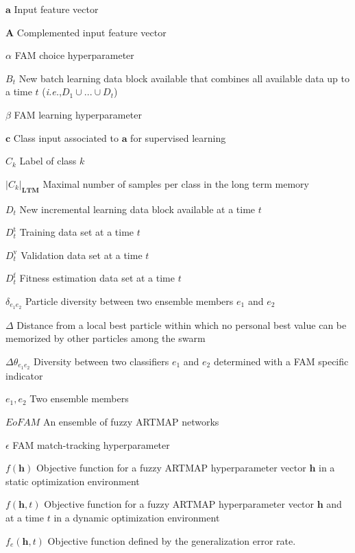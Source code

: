 \documentclass[letterpaper, twoside, 12pt, memoire, creativecommons, hyperref]{thETS}
\begin{document}
\begin{listofsymbols}[3cm]
\item [$\textbf{a}$] Input feature vector
\item [$\textbf{A}$] Complemented input feature vector
\item [$\alpha$] FAM choice hyperparameter
\item [$B_t$] New batch learning data block available that combines all available data up to a time $t$ (\emph{i.e.},$D_1 \cup ... \cup D_t$)
\item [$\beta$] FAM learning hyperparameter
\item [$\mathbf{c}$] Class input associated to $\textbf{a}$ for supervised learning
\item [$C_k$] Label of class $k$
\item [$|C_k|_\mathbf{LTM}$] Maximal number of samples per class in the long term memory
\item [$D_t$] New incremental learning data block available at a time $t$
\item [$D_t^\text{t}$] Training data set at a time $t$
\item [$D_t^\text{v}$] Validation data set at a time $t$
\item [$D_t^\text{f}$] Fitness estimation data set at a time $t$
\item [$\delta_{e_1e_2}$] Particle diversity between two ensemble members $e_1$ and $e_2$
\item [$\Delta$] Distance from a local best particle within which no personal best value can be memorized by other particles among the swarm
\item [$\Delta\theta_{e_1e_2}$] Diversity between two classifiers $e_1$ and $e_2$ determined with a FAM specific indicator
\item [$e_1,e_2$] Two ensemble members
\item [$\textit{EoFAM}$] An ensemble of fuzzy ARTMAP networks
\item [$\epsilon$] FAM match-tracking hyperparameter
\item [$f(\textbf{h})$] Objective function for a fuzzy ARTMAP hyperparameter vector $\textbf{h}$ in a static optimization environment
\item [$f(\textbf{h},t)$] Objective function for a fuzzy ARTMAP hyperparameter vector $\textbf{h}$ and at a time $t$ in a dynamic optimization environment
\item [$f_e(\mathbf{h},t)$] Objective function defined by the generalization error rate.

\end{listofsymbols}
\end{document}
